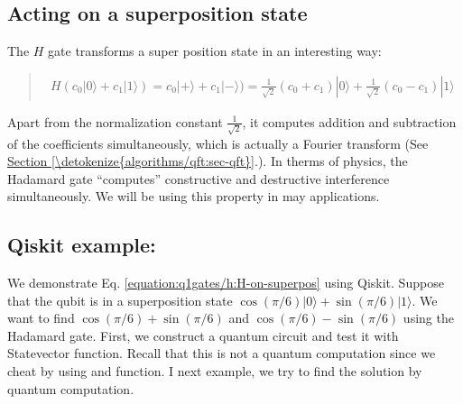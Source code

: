 \documentclass[letterpaper,10pt,english]{jupyterBook}
\begin{document}
\subsection{Acting on a superposition state}
\label{\detokenize{q1gates/h:acting-on-a-superposition-state}}\label{\detokenize{q1gates/h:sec-hgate-qft}}
\sphinxAtStartPar
The \(H\) gate transforms a super position state in an interesting way:
\begin{quote}
\begin{equation}\label{equation:q1gates/h:H-on-superpos}
\begin{split}
H \left (c_0 |0\rangle + c_1 |1\rangle\right)  = c_0 |+\rangle + c_1 |-\rangle)
=\frac{1}{\sqrt{2}}\left(c_0+c_1\right) |0\rangle + \frac{1}{\sqrt{2}}\left(c_0-c_1\right) |1\rangle
\end{split}
\end{equation}\end{quote}

\sphinxAtStartPar
Apart from the normalization constant \(\frac{1}{\sqrt{2}}\), it computes addition and subtraction of the coefficients simultaneously, which is actually a Fourier transform (See \hyperref[\detokenize{algorithms/qft:sec-qft}]{Section \ref{\detokenize{algorithms/qft:sec-qft}}}.).  In therms of physics, the Hadamard gate “computes” constructive and destructive interference simultaneously.  We will be using this property in may applications.


\subsection{Qiskit example:}
\label{\detokenize{q1gates/h:qiskit-example}}\label{\detokenize{q1gates/h:ex-hgate-interference}}
\sphinxAtStartPar
We demonstrate Eq. \eqref{equation:q1gates/h:H-on-superpos} using Qiskit.  Suppose that the qubit is in a superposition state \(\cos(\pi/6) |0\rangle + \sin(\pi/6)|1\rangle\).  We want to find \(\cos(\pi/6)+\sin(\pi/6)\) and \(\cos(\pi/6)-\sin(\pi/6)\) using the Hadamard gate.  First, we construct a quantum circuit and test it with Statevector function.  Recall that this is not a quantum computation since we cheat by using  and  function. I next example, we try to find the solution by quantum computation.
\end{document}
